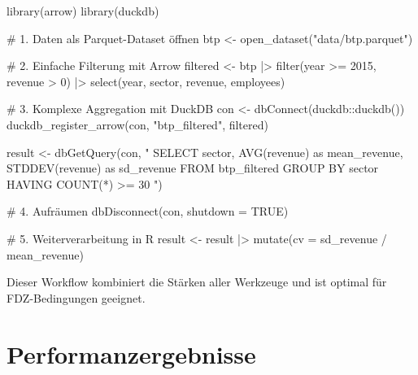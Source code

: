 \documentclass[
  ngerman,
  10pt,
  letterpaper,
  twocolumn]{book}
\newenvironment{Shaded}{\begin{snugshade}}{\end{snugshade}}
\newcommand{\AttributeTok}[1]{\textcolor[rgb]{0.40,0.45,0.13}{#1}}
\newcommand{\CommentTok}[1]{\textcolor[rgb]{0.37,0.37,0.37}{#1}}
\newcommand{\ConstantTok}[1]{\textcolor[rgb]{0.56,0.35,0.01}{#1}}
\newcommand{\DecValTok}[1]{\textcolor[rgb]{0.68,0.00,0.00}{#1}}
\newcommand{\FunctionTok}[1]{\textcolor[rgb]{0.28,0.35,0.67}{#1}}
\newcommand{\NormalTok}[1]{\textcolor[rgb]{0.00,0.23,0.31}{#1}}
\newcommand{\OtherTok}[1]{\textcolor[rgb]{0.00,0.23,0.31}{#1}}
\newcommand{\SpecialCharTok}[1]{\textcolor[rgb]{0.37,0.37,0.37}{#1}}
\newcommand{\StringTok}[1]{\textcolor[rgb]{0.13,0.47,0.30}{#1}}
\begin{document}
\begin{Shaded}
\begin{Highlighting}[]
\FunctionTok{library}\NormalTok{(arrow)}
\FunctionTok{library}\NormalTok{(duckdb)}

\CommentTok{\# 1. Daten als Parquet{-}Dataset öffnen}
\NormalTok{btp }\OtherTok{\textless{}{-}} \FunctionTok{open\_dataset}\NormalTok{(}\StringTok{"data/btp.parquet"}\NormalTok{)}

\CommentTok{\# 2. Einfache Filterung mit Arrow}
\NormalTok{filtered }\OtherTok{\textless{}{-}}\NormalTok{ btp }\SpecialCharTok{|\textgreater{}}
  \FunctionTok{filter}\NormalTok{(year }\SpecialCharTok{\textgreater{}=} \DecValTok{2015}\NormalTok{, revenue }\SpecialCharTok{\textgreater{}} \DecValTok{0}\NormalTok{) }\SpecialCharTok{|\textgreater{}}
  \FunctionTok{select}\NormalTok{(year, sector, revenue, employees)}

\CommentTok{\# 3. Komplexe Aggregation mit DuckDB}
\NormalTok{con }\OtherTok{\textless{}{-}} \FunctionTok{dbConnect}\NormalTok{(duckdb}\SpecialCharTok{::}\FunctionTok{duckdb}\NormalTok{())}
\FunctionTok{duckdb\_register\_arrow}\NormalTok{(con, }\StringTok{"btp\_filtered"}\NormalTok{, filtered)}

\NormalTok{result }\OtherTok{\textless{}{-}} \FunctionTok{dbGetQuery}\NormalTok{(con, }\StringTok{"}
\StringTok{  SELECT sector,}
\StringTok{         AVG(revenue) as mean\_revenue,}
\StringTok{         STDDEV(revenue) as sd\_revenue}
\StringTok{  FROM btp\_filtered}
\StringTok{  GROUP BY sector}
\StringTok{  HAVING COUNT(*) \textgreater{}= 30}
\StringTok{"}\NormalTok{)}

\CommentTok{\# 4. Aufräumen}
\FunctionTok{dbDisconnect}\NormalTok{(con, }\AttributeTok{shutdown =} \ConstantTok{TRUE}\NormalTok{)}

\CommentTok{\# 5. Weiterverarbeitung in R}
\NormalTok{result }\OtherTok{\textless{}{-}}\NormalTok{ result }\SpecialCharTok{|\textgreater{}} 
  \FunctionTok{mutate}\NormalTok{(}\AttributeTok{cv =}\NormalTok{ sd\_revenue }\SpecialCharTok{/}\NormalTok{ mean\_revenue)}
\end{Highlighting}
\end{Shaded}

Dieser Workflow kombiniert die Stärken aller Werkzeuge und ist optimal
für FDZ-Bedingungen geeignet.


\chapter{Performanzergebnisse}\label{sec-performance}
\end{document}

